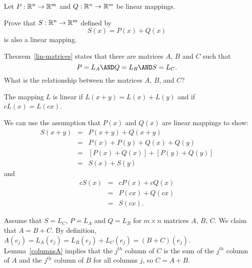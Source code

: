 \documentclass{article}
\begin{document}
\begin{exercise}  \label{c4.3.12}
Let $P:\mathbb R^n\to\mathbb R^m$ and $Q:\mathbb R^n\to\mathbb R^m$ be linear mappings. 
\begin{enumeratea}
\item Prove that $S:\mathbb R^n\to\mathbb R^m$ defined by
\[
S(x) = P(x) + Q(x)
\]
is also a linear mapping.  
\item Theorem~\ref{lin-matrices} states that there are matrices $A$, $B$ and $C$ such that
\[
P = L_A \AND Q = L_B \AND S = L_C .
\]
What is the relationship between the matrices $A$, $B$, and $C$?
\end{enumeratea}

\begin{solution}

\soln The mapping $L$ is linear if $L(x + y) = L(x) + L(y)$ and if $cL(x) = L(cx)$.  
\begin{enumeratea}
\item We can use the assumption that $P(x)$ and $Q(x)$ are linear mappings to show:
\[ 
\begin{array}{rcl}
S(x + y) & = & P(x + y) + Q(x + y) \\
& = & P(x) + P(y) + Q(x) + Q(y) \\
& = & [P(x) + Q(x)] + [P(y) + Q(y)] \\
& = & S(x) + S(y) 
\end{array} 
\]
and
\[ 
\begin{array}{rcl}
cS(x) & = & cP(x) + cQ(x) \\
& = & P(cx) + Q(cx) \\
& = & S(cx). 
\end{array} 
\]

\item Assume that $S = L_C$, $P = L_A$ and $Q = L_B$ for
$m \times n$ matrices $A$, $B$, $C$.  We claim that
$A = B + C$.  By definition, $A(e_j) = L_A(e_j) =  L_B(e_j) + L_C(e_j) = (B+C)(e_j)$.  
Lemma~\ref{columnsA} implies that the $j^{th}$ column of 
$C$ is the sum of the $j^{th}$ column of $A$  and the $j^{th}$ column of $B$ 
for all columns $j$, so $C = A + B$.
\end{enumeratea}
\end{solution}
\end{exercise}





\problemlabel
\end{document}
